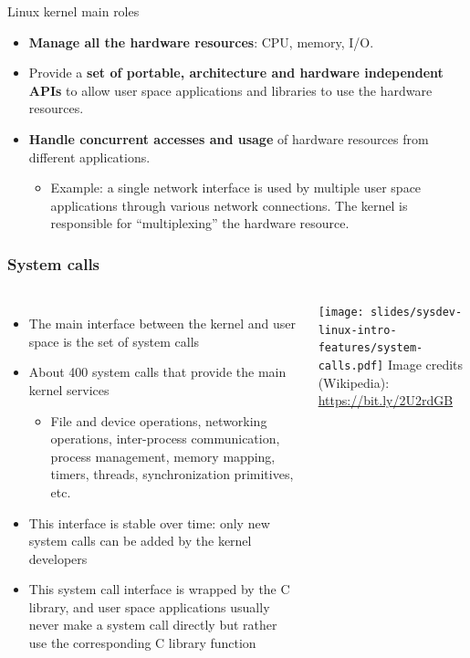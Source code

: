 \begin{frame}{Linux kernel main roles}
  \begin{itemize}
  \item {\bf Manage all the hardware resources}: CPU, memory, I/O.
  \item Provide a {\bf set of portable, architecture and hardware
      independent APIs} to allow user space applications and libraries
    to use the hardware resources.
  \item {\bf Handle concurrent accesses and usage} of hardware
    resources from different applications.
    \begin{itemize}
    \item Example: a single network interface is used by multiple
      user space applications through various network connections. The
      kernel is responsible for ``multiplexing'' the hardware resource.
    \end{itemize}
  \end{itemize}
\end{frame}

\begin{frame}
  \frametitle{System calls}
  \begin{columns}
    \begin{itemize}
    \item The main interface between the kernel and user space is the set
      of system calls
    \item About 400 system calls that provide the main kernel services
      \begin{itemize}
      \item File and device operations, networking operations,
        inter-process communication, process management, memory mapping,
        timers, threads, synchronization primitives, etc.
      \end{itemize}
    \item This interface is stable over time: only new system calls can
      be added by the kernel developers
    \item This system call interface is wrapped by the C library, and
      user space applications usually never make a system call directly
      but rather use the corresponding C library function
    \end{itemize}
      \texttt{[image: slides/sysdev-linux-intro-features/system-calls.pdf]}
      \scriptsize
      Image credits (Wikipedia):\\
      \url{https://bit.ly/2U2rdGB}
    \end{columns}
\end{frame}

